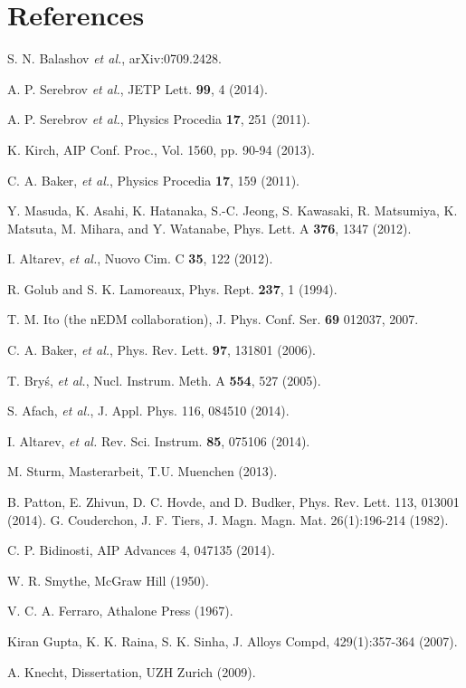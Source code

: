 \documentclass[review]{elsarticle}
\begin{document}
\section*{References}


\begin{thebibliography}{00}

 S. N. Balashov {\it et al.}, arXiv:0709.2428.

 A. P. Serebrov {\it et al.}, JETP Lett. {\bf 99}, 4
  (2014).

 A. P. Serebrov {\it et al.}, Physics Procedia {\bf
  17}, 251 (2011).

 K. Kirch, AIP Conf. Proc., Vol. 1560, pp. 90-94
  (2013).

 C. A. Baker, {\it et al.}, Physics Procedia {\bf
  17}, 159 (2011).

 Y. Masuda, K. Asahi, K. Hatanaka, S.-C. Jeong,
  S. Kawasaki, R. Matsumiya, K. Matsuta, M. Mihara, and Y. Watanabe,
  Phys. Lett. A {\bf 376}, 1347 (2012).

 I. Altarev, {\it et al.}, Nuovo Cim. C {\bf
  35}, 122 (2012).

 R. Golub and S. K. Lamoreaux, Phys. Rept.  {\bf
  237}, 1 (1994).

 T. M. Ito (the nEDM collaboration),
  J. Phys. Conf. Ser. {\bf 69} 012037, 2007.

 C. A. Baker, {\it et al.}, Phys. Rev. Lett. {\bf
  97}, 131801 (2006).

 T. Bry\'s, {\it et al.}, Nucl. Instrum. Meth. A
  {\bf 554}, 527 (2005).

 S. Afach, {\it et al.}, J. Appl. Phys. 116, 084510 (2014).

 I. Altarev, {\it et al.}
  Rev. Sci. Instrum. {\bf 85}, 075106 (2014).

 M. Sturm, Masterarbeit, T.U. Muenchen (2013).

 B. Patton, E. Zhivun, D. C. Hovde, and D. Budker,
  Phys. Rev. Lett. 113, 013001 (2014).
 G. Couderchon, J. F. Tiers, J. Magn. Magn. Mat. 26(1):196-214 (1982).

 C. P. Bidinosti, AIP Advances 4, 047135 (2014).

 W. R. Smythe, McGraw Hill (1950).

 V. C. A. Ferraro, Athalone Press (1967).

 Kiran Gupta, K. K. Raina, S. K. Sinha, J. Alloys Compd, 429(1):357-364 (2007).

 A. Knecht, Dissertation, UZH Zurich (2009).
\end{thebibliography}
\end{document}
